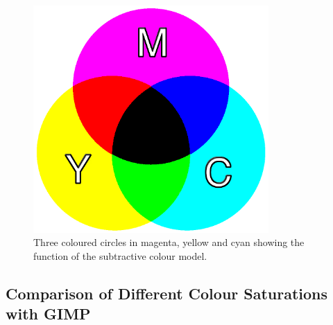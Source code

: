 \documentclass[../MasterThesis.tex]{subfiles}
\begin{document}
\begin{minipage}{0.48\textwidth}
\begin{figure}[H]
	\centering
	
	\includegraphics[width=0.8\textwidth]{YMCA.png}
	
	\caption[Subtractive colour model of RGB]{Three coloured circles in magenta, yellow and cyan showing the function of the subtractive colour model.}
	\label{figure:othercolourwheel}
	
\end{figure}
\end{minipage}

\vspace*{1em}


	
	

	









\subsection{Comparison of Different Colour Saturations with GIMP}
\label{subsection:ComparisonOfDifferentColourSaturations}
\end{document}
